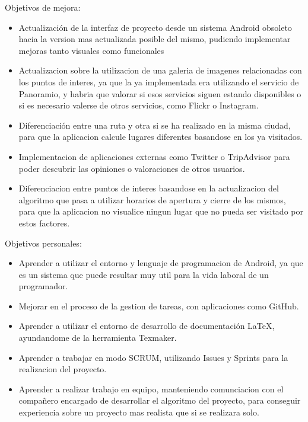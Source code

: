 

Objetivos de mejora:
\begin{itemize}
\item Actualización de la interfaz de proyecto desde un sistema Android obsoleto hacia la version mas actualizada posible del mismo, pudiendo implementar mejoras tanto visuales como funcionales
\item Actualizacion sobre la utilizacion de una galeria de imagenes relacionadas con los puntos de interes, ya que la ya implementada era utilizando el servicio de Panoramio, y habria que valorar si esos servicios siguen estando disponibles o si es necesario valerse de otros servicios, como Flickr o Instagram.
\item Diferenciación entre una ruta y otra si se ha realizado en la misma ciudad, para que la aplicacion calcule lugares diferentes basandose en los ya visitados.
\item Implementacion de aplicaciones externas como Twitter o TripAdvisor para poder descubrir las opiniones o valoraciones de otros usuarios.
\item Diferenciacion entre puntos de interes basandose en la actualizacion del algoritmo que pasa a utilizar horarios de apertura y cierre de los mismos, para que la aplicacion no visualice ningun lugar que no pueda ser visitado por estos factores.
\end{itemize}

Objetivos personales:
\begin{itemize}
\item Aprender a utilizar el entorno y lenguaje de programacion de Android, ya que es un sistema que puede resultar muy util para la vida laboral de un programador.
\item Mejorar en el proceso de la gestion de tareas, con aplicaciones como GitHub.
\item Aprender a utilizar el entorno de desarrollo de documentación LaTeX, ayundandome de la herramienta Texmaker.
\item Aprender a trabajar en modo SCRUM, utilizando Issues y Sprints para la realizacion del proyecto.
\item Aprender a realizar trabajo en equipo, manteniendo comunciacion con el compañero encargado de desarrollar el algoritmo del proyecto, para conseguir experiencia sobre un proyecto mas realista que si se realizara solo.
\end{itemize}

